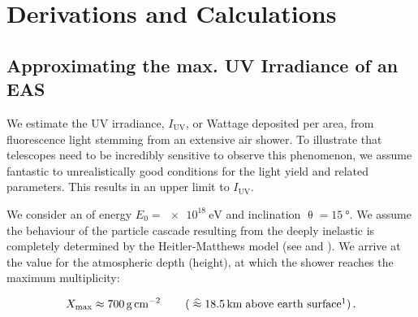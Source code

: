
\chapter{Derivations and Calculations}
\label{app:derivation}


\section{Approximating the max. UV Irradiance of an EAS}
\label{app:cr-uv-irradiance}

We estimate the UV irradiance, $I_\text{UV}$, or Wattage deposited per area, 
from fluorescence light stemming from an extensive air shower. To illustrate 
that telescopes need to be incredibly sensitive to observe this phenomenon, we 
assume fantastic to unrealistically good conditions for the \UV light yield and 
related parameters. This results in an  upper limit to $I_\text{UV}$.

We consider an \EAS of energy $E_0 = \SI{e18}{\eV}$ and inclination 
$\uptheta=\SI{15}{\degree}$. We assume the behaviour of the particle cascade 
resulting from the deeply inelastic is completely determined by the 
Heitler-Matthews model (see  and 
\cite{matthewsHeitlerModelExtensive2005, rissePhotonAirShowers2006}). We arrive
at the value for the atmospheric depth (height), at which the shower reaches the
maximum multiplicity:

\begin{equation}
\label{eq:irradiance-multiplicity}
\Xmax \approx \SI{700}{\gram\per\centi\meter\squared}\qquad\left(\;\widehat{\approx}\;\SI{18.5}{\kilo\meter}\;\text{above earth surface}\footnotemark\right).
\end{equation}

